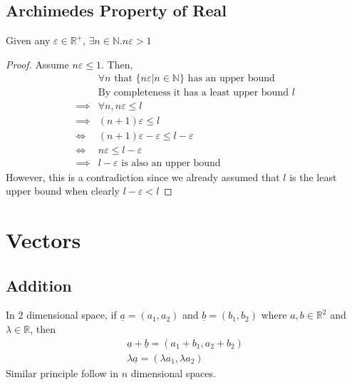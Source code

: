 \documentclass[a4paper]{article}
\theoremstyle{plain}
\newtheorem{thm}{Theorem}[section]
\theoremstyle{definition}
\theoremstyle{remark}
\begin{document}
\subsection{Archimedes Property of Real}
\begin{tcolorbox}[colback=black!3!white,colframe=black!60!white,title=\begin{thm}Archimedes Property of Reals \label{Archimedes Property of Reals}\end{thm}]
	Given any $\varepsilon \in \mathbb{R}^{+}$, $\exists n \in \mathbb{N} . n \varepsilon >1$ 
	\begin{proof}
		Assume $n \varepsilon \le 1$. Then,
		\begin{align}
			&\forall n \text{ that } \{ n \varepsilon | n \in \mathbb{N}\} \text{ has an upper bound} \\
			&\text{By completeness it has a least upper bound $l$} \\
			\implies& \forall n, n \varepsilon \le l \\
			\implies& (n+1) \varepsilon \le l \\
			\iff &(n+1)\varepsilon - \varepsilon \le l - \varepsilon\\
			\iff &n \varepsilon \le  l - \varepsilon \\
			\implies &l - \varepsilon \text{ is also an upper bound}
		\end{align}
		However, this is a contradiction since we already assumed that $l$ is the least upper bound when clearly $ l - \varepsilon < l$
	\end{proof}
\end{tcolorbox}
\section{Vectors}
\subsection{Addition}
In 2 dimensional space, if $\underline{a} = (a_1,a_2)$ and $\underline{b} = (b_1,b_2)$ where $a,b \in \mathbb{R}^2$ and $\lambda \in \mathbb{R}$, then
\begin{align*}
	\underline{a} + \underline{b} = (a_1+b_1, a_2+b_2) \\
	\lambda \underline{a} = (\lambda a_1, \lambda a_2)
\end{align*}
Similar principle follow in $n$ dimensional spaces. 
\end{document}
